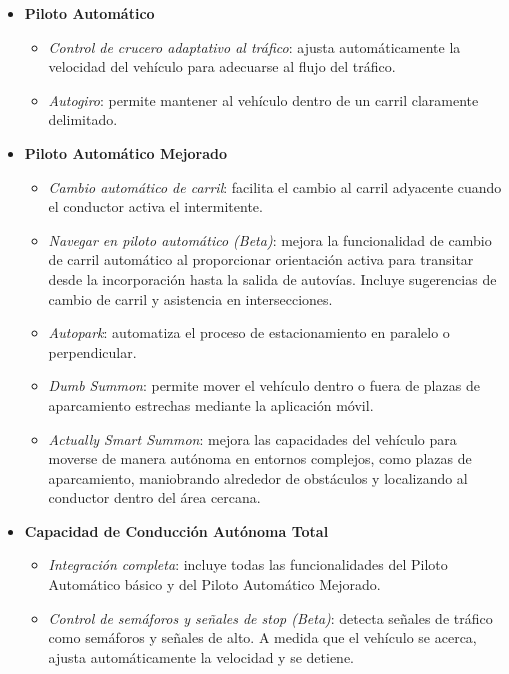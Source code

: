 \begin{itemize}
    \item \textbf{Piloto Automático}
    \begin{itemize}
        \item \textit{Control de crucero adaptativo al tráfico}: ajusta automáticamente la velocidad del vehículo para adecuarse al flujo del tráfico.
        \item \textit{Autogiro}: permite mantener al vehículo dentro de un carril claramente delimitado.
    \end{itemize}
    \item \textbf{Piloto Automático Mejorado}
    \begin{itemize}
        \item \textit{Cambio automático de carril}: facilita el cambio al carril adyacente cuando el conductor activa el intermitente.
        \item \textit{Navegar en piloto automático (Beta)}: mejora la funcionalidad de cambio de carril automático al proporcionar orientación activa para transitar desde la incorporación hasta la salida de autovías. Incluye sugerencias de cambio de carril y asistencia en intersecciones.
        \item \textit{Autopark}: automatiza el proceso de estacionamiento en paralelo o perpendicular.
        \item \textit{Dumb Summon}: permite mover el vehículo dentro o fuera de plazas de aparcamiento estrechas mediante la aplicación móvil.
        \item \textit{Actually Smart Summon}: mejora las capacidades del vehículo para moverse de manera autónoma en entornos complejos, como plazas de aparcamiento, maniobrando alrededor de obstáculos y localizando al conductor dentro del área cercana.
    \end{itemize}
    \item \textbf{Capacidad de Conducción Autónoma Total}
    \begin{itemize}
        \item \textit{Integración completa}: incluye todas las funcionalidades del Piloto Automático básico y del Piloto Automático Mejorado.
        \item \textit{Control de semáforos y señales de stop (Beta)}: detecta señales de tráfico como semáforos y señales de alto. A medida que el vehículo se acerca, ajusta automáticamente la velocidad y se detiene.
    \end{itemize}
\end{itemize}

